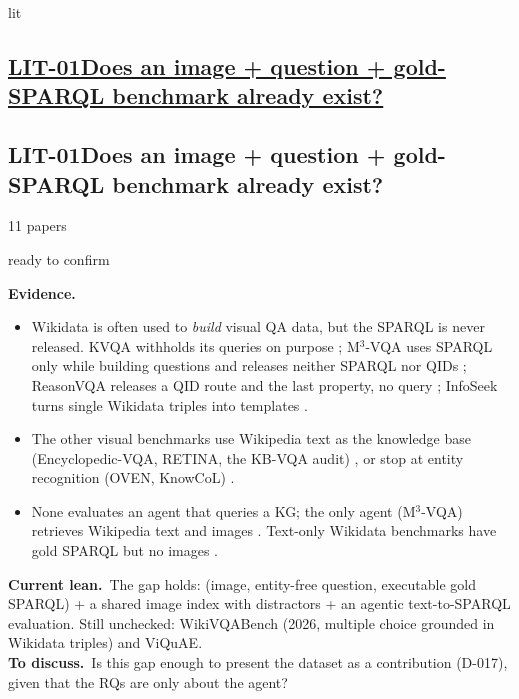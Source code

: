 \documentclass[10pt,a4paper]{article}
\newcommand{\st}[2]{\colorbox{#1}{\footnotesize\strut #2}}
\newcommand{\ready}{\st{green!20}{ready to confirm}}
\newcommand{\qblock}[1][]{\def\qkey{#1}\qblockx}
\newcommand{\qblockx}[4]{%
  \ifx\qkey\empty
  \subsection*{\underline{#1\quad #2}}%
  \else\hypertarget{\qkey}{}
  \subsection*{#1\quad #2}\fi%
{\footnotesize #3 papers\quad}#4\par}
\newcommand{\ev}{\textbf{Evidence.}}
\newcommand{\lean}{\textbf{Current lean.}}
\newcommand{\ask}{\textbf{To discuss.}}
\begin{document}
\qblock[lit]{LIT-01}{Does an image + question + gold-SPARQL benchmark
already exist?}{11}{\ready}
\ev
\begin{itemize}
  \item Wikidata is often used to \emph{build} visual QA data, but the SPARQL
    is never released. KVQA withholds its queries on purpose
    \cite[S3]{shah2019kvqa}; M$^3$-VQA uses SPARQL only while building
    questions and releases neither SPARQL nor QIDs \cite[\S\,4.1]{ma2026m3};
    ReasonVQA releases a QID route and the last property, no query
    \cite[App.~1.2]{tran2025reasonvqa}; InfoSeek turns single Wikidata triples
    into templates \cite[\S\,3.2]{chen2023can}.
  \item The other visual benchmarks use Wikipedia text as the knowledge base
    (Encyclopedic-VQA, RETINA, the KB-VQA audit)
    \cite{mensink2023encyclopedic,lee2025breaking,ma2026identifying}, or stop
    at entity recognition (OVEN, KnowCoL) \cite{hu2023open,zhou2025seeing}.
  \item None evaluates an agent that queries a KG; the only agent
    (M$^3$-VQA) retrieves Wikipedia text and images \cite[\S\,5.4]{ma2026m3}.
    Text-only Wikidata benchmarks have gold SPARQL but no images
    \cite{loustaunau2025qawiki,walter2026grasp}.
\end{itemize}
\lean\ The gap holds: (image, entity-free question, executable gold SPARQL)
+ a shared image index with distractors + an agentic text-to-SPARQL
evaluation. Still unchecked: WikiVQABench (2026, multiple choice grounded in
Wikidata triples) and ViQuAE.\\
\ask\ Is this gap enough to present the dataset as a contribution
(D-017), given that the RQs are only about the agent?
\end{document}
